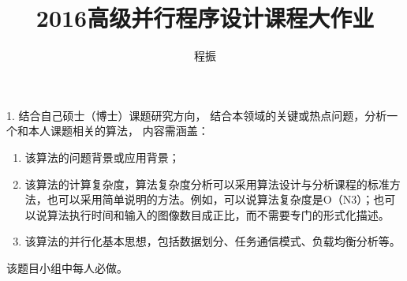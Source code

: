 \documentclass{ctexart}
\author{程振}
\title{2016高级并行程序设计课程大作业}
\begin{document}
\maketitle

1. 结合自己硕士（博士）课题研究方向，
结合本领域的关键或热点问题，分析一个和本人课题相关的算法，
内容需涵盖：

\begin{enumerate}[label=(\alph*)]
    \item 该算法的问题背景或应用背景；
    \item 该算法的计算复杂度，算法复杂度分析可以采用算法设计与分析课程的标准方法，也可以采用简单说明的方法。例如，可以说算法复杂度是O（N3）；也可以说算法执行时间和输入的图像数目成正比，而不需要专门的形式化描述。
    \item 该算法的并行化基本思想，包括数据划分、任务通信模式、负载均衡分析等。
\end{enumerate}
    该题目小组中每人必做。
\end{document}

